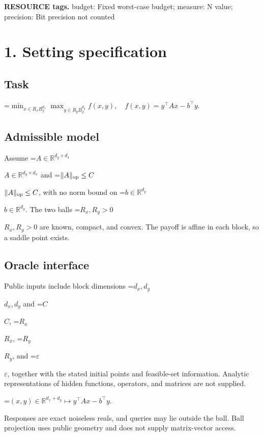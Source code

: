 \documentclass[10pt,a4paper]{article}
\newcommand{\AtlasMath}[1]{\par\begingroup\centering\setbox0=\hbox{$\displaystyle #1$}\ifdim\wd0>1.4\linewidth\typeout{ATLAS WIDE FORMULA: \the\wd0}\fi\ifdim\wd0>\linewidth\resizebox{\linewidth}{!}{\box0}\else\box0\fi\par\endgroup}
\newcommand{\AtlasInlineMath}[1]{\begingroup\setbox0=\hbox{$#1$}\ifdim\wd0>.4\linewidth\endgroup\AtlasMath{#1}\else\endgroup$#1$\fi}
\begin{document}
\textbf{RESOURCE tags.} budget: Fixed worst-case budget; measure: N value; precision: Bit precision not counted



\section{1. Setting specification}


\subsection{Task}



\AtlasMath{\min_{x\in R_xB_2^{d_x}}\max_{y\in R_yB_2^{d_y}}f(x,y),\quad f(x,y)=y^\top Ax-b^\top y.}




\subsection{Admissible model}


Assume \AtlasInlineMath{A\in\mathbb{R}^{d_y\times d_x}} and \AtlasInlineMath{\|A\|_{\rm op}\le C}, with no norm bound on \AtlasInlineMath{b\in\mathbb{R}^{d_y}}. The two balls \AtlasInlineMath{R_x,R_y>0} are known, compact, and convex. The payoff is affine in each block, so a saddle point exists.



\subsection{Oracle interface}


Public inputs include block dimensions \AtlasInlineMath{d_x,d_y} and \AtlasInlineMath{C}, \AtlasInlineMath{R_x}, \AtlasInlineMath{R_y}, and \AtlasInlineMath{\varepsilon}, together with the stated initial points and feasible-set information. Analytic representations of hidden functions, operators, and matrices are not supplied.




\AtlasMath{(x,y)\in\mathbb{R}^{d_x+d_y}\longmapsto y^\top Ax-b^\top y.}




Responses are exact noiseless reals, and queries may lie outside the ball. Ball projection uses public geometry and does not supply matrix-vector access.
\end{document}

